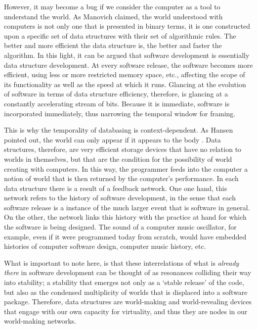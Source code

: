 However, it may become a bug if we consider the computer as a tool to understand the world. As Manovich claimed, the world understood with computers is not only one that is presented in binary terms, it is one constructed upon a specific set of data structures with their set of algorithmic rules. The better and more efficient the data structure is, the better and faster the algorithm. In this light, it can be argued that software development is essentially data structure development. At every software release, the software becomes more efficient, using less or more restricted memory space, etc., affecting the scope of its functionality as well as the speed at which it runs. Glancing at the evolution of software in terms of data structure efficiency, therefore, is glancing at a constantly accelerating stream of bits. Because it is immediate, software is incorporated immediately, thus narrowing the temporal window for framing.

This is why the temporality of databasing is context-dependent. As Hansen pointed out, the world can only appear if it appears to the body . Data structures, therefore, are very efficient storage devices that have no relation to worlds in themselves, but that are the condition for the possibility of world creating with computers. In this way, the programmer feeds into the computer a notion of world that is then returned by the computer's performance. In each data structure there is a result of a feedback network. One one hand, this network refers to the history of software development, in the sense that each software release is a instance of the much larger event that is software in general. On the other, the network links this history with the practice at hand for which the software is being designed. The sound of a computer music oscillator, for example, even if it were programmed today from scratch, would have embedded histories of computer software design, computer music history, etc.

What is important to note here, is that these interrelations of what is \textit{already there} in software development can be thought of as resonances colliding their way into stability; a stability that emerges not only as a `stable release' of the code, but also as the condensed multiplicity of worlds that is displaced into a software package. Therefore, data structures are world-making and world-revealing devices that engage with our own capacity for virtuality, and thus they are nodes in our world-making networks.


